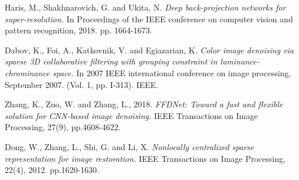 \documentclass[twocolumn]{svjour3}          %
\begin{document}
\begin{thebibliography}{00}
 Haris, M., Shakhnarovich, G. and Ukita, N. \textit{Deep back-projection networks for super-resolution.} In Proceedings of the IEEE conference on computer vision and pattern recognition, 2018. pp. 1664-1673.

 Dabov, K., Foi, A., Katkovnik, V. and Egiazarian, K. \textit{Color image denoising via sparse 3D collaborative filtering with grouping constraint in luminance-chrominance space.} In 2007 IEEE international conference on image processing, September 2007. (Vol. 1, pp. I-313). IEEE.

 Zhang, K., Zuo, W. and Zhang, L., 2018. \textit{FFDNet: Toward a fast and flexible solution for CNN-based image denoising.} IEEE Transactions on Image Processing, 27(9), pp.4608-4622.

 Dong, W., Zhang, L., Shi, G. and Li, X. \textit{Nonlocally centralized sparse representation for image restoration.} IEEE Transactions on Image Processing, 22(4),  2012. pp.1620-1630.


\end{thebibliography}

%
%



%
%
\end{document}
